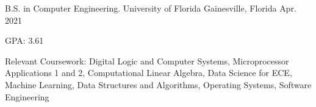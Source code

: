 


\begin{cventries}


\cventry
{B.S. in Computer Engineering.} %
{University of Florida} %
{Gainesville, Florida} %
{Apr. 2021} %
{ %
\begin{cvitems}
\item {GPA: 3.61}
\item Relevant Coursework:
\setlength{\parindent}{.125in}
\newline
Digital Logic and Computer Systems, Microprocessor Applications 1 and 2, Computational Linear Algebra, Data Science for ECE, 
\newline
Machine Learning, Data Structures and Algorithms, Operating Systems, Software Engineering
\end{cvitems}
}


\end{cventries}
